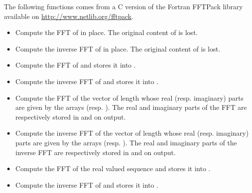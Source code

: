 The following functions comes from a C version of the Fortran FFTPack library
available on \url{http://www.netlib.org/fftpack}.
\begin{itemize}
\item {}
  \sshortdescribe Compute the FFT of  in place. The original content
  of  is lost.

\item {}
  \sshortdescribe Compute the inverse FFT of  in place. The
  original content of  is lost.

\item {}
  \sshortdescribe Compute the FFT of  and stores it into .

\item {}
  \sshortdescribe Compute the inverse FFT of  and stores it into .

\item {}
  \sshortdescribe Compute the FFT of the vector of length  whose real
  (resp. imaginary) parts are given by the arrays 
  (resp. ). The real and imaginary parts of the FFT are respectively
  stored in  and  on output.

\item {}
  \sshortdescribe Compute the inverse FFT of the vector of length 
  whose real (resp. imaginary) parts are given by the arrays 
  (resp. ). The real and imaginary parts of the inverse FFT are
  respectively stored in  and  on output.

\item {}
  \sshortdescribe Compute the FFT of the real valued sequence  and
  stores it into .

\item {}
  \sshortdescribe Compute the inverse FFT of  and stores it into .


\end{itemize}
